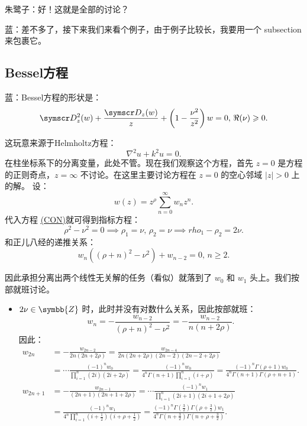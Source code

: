 朱鹭子：好！这就是全部的讨论？

蓝：差不多了，接下来我们来看个例子，由于例子比较长，我要用一个 subsection 来包裹它。

\subsection{Bessel方程}

蓝：Bessel方程的形状是：
\[
	\ddw+\frac{\dw}{z}+ \left( 1- \frac{\nu^2}{z^2 } \right) w=0,\, \Re(\nu )\geqslant 0
	.\]

这玩意来源于Helmholtz方程：
\[
	\nabla^2u+k^2 u=0
	.\]
在柱坐标系下的分离变量，此处不管。现在我们观察这个方程，首先 \(z=0\) 是方程的正则奇点，\(z=\infty\) 不讨论。在这里主要讨论方程在 \(z=0\) 的空心邻域 \(\left\vert z \right\vert >0\) 上的解。
设：
\[
	w(z)=z^\rho \sum_{n=0}^{\infty} w_n z^{n}
	.\]
代入方程 \hyperref[CON]{\underline{(CON)}}就可得到指标方程：
\[
	\rho ^2-\nu ^2=0 \implies \rho _1=\nu ,\,\rho _2=\nu \implies rho_1-\rho _2=2\nu
	.\]
和正儿八经的递推关系：
\[
	w_n((\rho +n)^2-\nu ^2)+w_{n-2}=0,\,n\geqslant 2
	.\]

因此承担分离出两个线性无关解的任务（看似）就落到了 \(w_0\) 和  \(w_1\) 头上。我们按部就班讨论。

\begin{itemize}\kaiti
	\item \(2\nu \in\symbb{Z} \) 时，此时并没有对数什么关系，因此按部就班：
	      \[
		      w_n= -\frac{w_{n-2}}{(\rho +n)^2-\nu ^2}=-\frac{w_{n-2}}{n(n+2\rho )}
		      .\]
	      因此：
	      \[
		      \begin{aligned}
			      w_{2n}   & = -\frac{w_{2n-2}}{2n(2n+2\rho )}=\frac{w_{2n-4}}{2n(2n+2\rho )(2n-2)(2n-2+2\rho )}                                                                                                         \\
			               & =\dotsm\frac{(-1)^nw_0}{\prod_{i=1}^{n} (2i)(2i+2\rho )}=\frac{(-1)^nw_0}{4^n \Gamma (n+1)\prod_{i=1}^{n}(i+\rho )}=\frac{(-1)^n \Gamma (\rho +1)w_0}{4^n \Gamma (n+1) \Gamma (\rho +n+1)}. \\
			      w_{2n+1} & = -\frac{w_{2n-1}}{(2n+1)(2n+1+2\rho )} =\cdots \frac{(-1)^nw_1}{\prod_{i=1}^{n} (2i+1)(2i+1+2\rho )}                                                                                       \\
			               & = \frac{(-1)^nw_1}{4^n\prod_{i=1}^{n}\left( i+\frac{1}{2} \right) \left( i+\rho +\frac{1}{2} \right) }=
			      \frac{(-1)^n \Gamma (\frac{3}{2})\Gamma \left( \rho +\frac{3}{2} \right) w_1}{4^n \Gamma \left( n+\frac{3}{2} 	\right) \Gamma \left( n+\rho +\frac{3}{2} \right)  }.
		      \end{aligned}
	      \]
\end{itemize}

